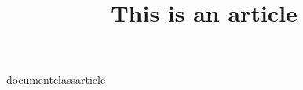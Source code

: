 documentclass{article}
\usepackage{blindtext}

\title{This is an article}



\maketitle

\begin{abstract}
\blindtext
\end{abstract}

